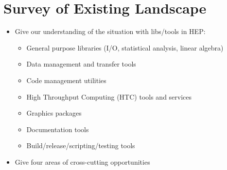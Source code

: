 \section{Survey of Existing Landscape}

\begin{itemize}
\item Give our understanding of the situation with libs/tools in HEP:
\begin{itemize}
\item General purpose libraries (I/O, statistical analysis, linear algebra)
\item Data management and transfer tools
\item Code management utilities
\item High Throughput Computing (HTC) tools and services
\item Graphics packages
\item Documentation tools
\item Build/release/scripting/testing tools
\end{itemize}
\item Give four areas of cross-cutting opportunities
\end{itemize}








